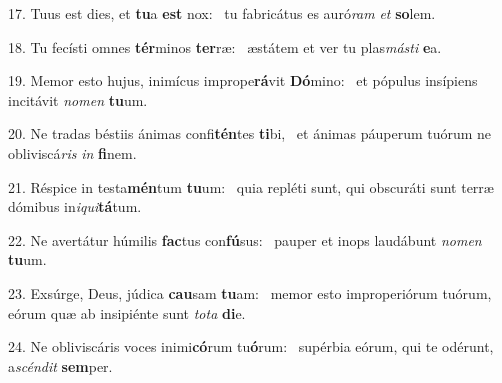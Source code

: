 17. Tuus est dies, et \textbf{tu}a \textbf{est} nox: \ast\  tu fabricátus es auró\textit{ram} \textit{et} \textbf{so}lem.\

18. Tu fecísti omnes \textbf{tér}minos \textbf{ter}ræ: \ast\  æstátem et ver tu plas\textit{más}\textit{ti} \textbf{e}a.\

19. Memor esto hujus, inimícus imprope\textbf{rá}vit \textbf{Dó}mino: \ast\  et pópulus insípiens incitávit \textit{no}\textit{men} \textbf{tu}um.\

20. Ne tradas béstiis ánimas confi\textbf{tén}tes \textbf{ti}bi, \ast\  et ánimas páuperum tuórum ne obliviscá\textit{ris} \textit{in} \textbf{fi}nem.\

21. Réspice in testa\textbf{mén}tum \textbf{tu}um: \ast\  quia repléti sunt, qui obscuráti sunt terræ dómibus in\textit{i}\textit{qui}\textbf{tá}tum.\

22. Ne avertátur húmilis \textbf{fac}tus con\textbf{fú}sus: \ast\  pauper et inops laudábunt \textit{no}\textit{men} \textbf{tu}um.\

23. Exsúrge, Deus, júdica \textbf{cau}sam \textbf{tu}am: \ast\  memor esto improperiórum tuórum, eórum quæ ab insipiénte sunt \textit{to}\textit{ta} \textbf{di}e.\

24. Ne obliviscáris voces inimi\textbf{có}rum tu\textbf{ó}rum: \ast\  supérbia eórum, qui te odérunt, a\textit{scén}\textit{dit} \textbf{sem}per.\

